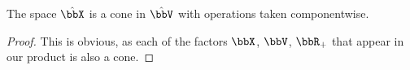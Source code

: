 \begin{lemma}
  \label{lemma:joint-cone}
  The space $\hat\stateSpace$ is a cone in $\hat\vecSpace$ with operations taken componentwise.
\end{lemma}
\begin{proof}
  \label{proof:lemma:joint-cone}
  This is obvious, as each of the factors $\stateSpace$, $\vecSpace$, $\bbR_+$ that appear in our product is also a cone.
\end{proof}
